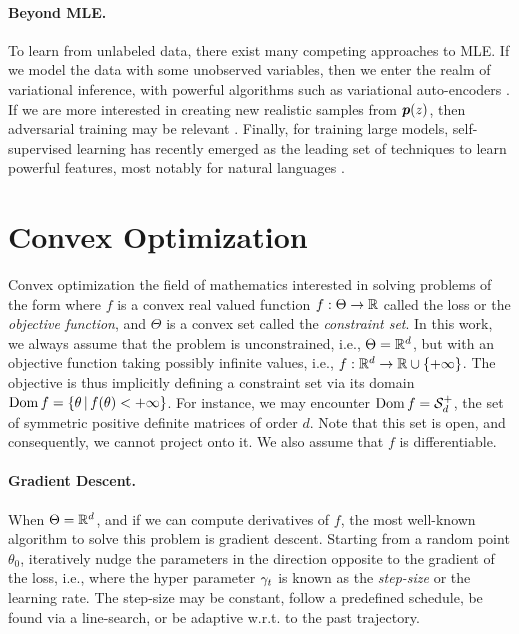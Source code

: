 \paragraph{Beyond MLE.} 
To learn from unlabeled data, there exist many competing approaches to MLE. 
If we model the data with some unobserved variables, then we enter the realm of variational inference, with powerful algorithms such as variational auto-encoders \citep{kingma2013auto}. 
If we are more interested in creating new realistic samples from $\bm{p}(z)$, then adversarial training may be relevant \citep{goodfellow2014generative}.
Finally, for training large models, self-supervised learning has recently emerged as the leading set of techniques to learn powerful features, most notably for natural languages \citep{peters2018deep,devlin2018bert}.


\section{Convex Optimization}
Convex optimization the field of mathematics interested in solving problems of the form
where $f$ is a convex real valued function $f:\Theta \rightarrow \mathbb{R}$ called the loss or the \emph{objective function}, and $\Theta$ is a convex set called the \emph{constraint set}.
In this work, we always assume that the problem is unconstrained, i.e., $\Theta = \mathbb{R}^d$, 
but with an objective function taking possibly infinite values, i.e., $f: \mathbb{R}^d \rightarrow \mathbb{R} \cup \{+\infty\}$. 
The objective is thus implicitly defining a constraint set via its domain $\operatorname{\mathrm{Dom}} f = \{ \theta \,\vert\, f(\theta) < +\infty \}$.
For instance, we may encounter $\operatorname{\mathrm{Dom}} f = {\mathcal S}_d^+$, the set of symmetric positive definite matrices of order $d$. Note that this set is open, and consequently, we cannot project onto it.
We also assume that $f$ is differentiable.

\paragraph{Gradient Descent.}
When $\Theta = \mathbb{R}^d$, and if we can compute derivatives of $f$, the most well-known algorithm to solve this problem is gradient descent. 
Starting from a random point $\theta_0$, iteratively nudge the parameters in the direction opposite to the gradient of the loss, i.e.,
where the hyper parameter $\gamma_t$ is known as the \emph{step-size} or the learning rate. 
The step-size may be constant, follow a predefined schedule, be found via a line-search, or be adaptive w.r.t. to the past trajectory.

